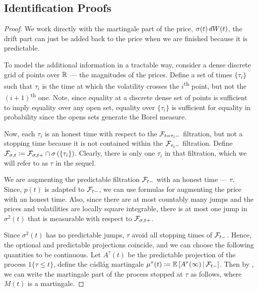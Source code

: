 \documentclass[11pt, letterpaper, twoside, final]{article}
\begin{document}
\begin{appendices}


\section{Identification Proofs}

\priceDGPGivenVol*

\begin{proof}

    We work directly with the martingale part of the price, $\sigma(t) \mathop{}\!d W(t)$, the drift part can just be
    added back to the price when we are finished because it is predictable.
    
    To model the additional information in a tractable way, consider a dense discrete grid of points over $\mathbb{R}$ ---
    the magnitudes of the prices.
    Define a set of times $\lbrace \tau_i\rbrace $ such that $\tau_i$ is the time at which the volatility crosses
    the $i$\textsuperscript{th} point, but not the $(i+1)$\textsuperscript{th} one. 
    Note, since equality at a discrete dense set of points is sufficient to imply equality over any open set,
    equality over $\lbrace \tau_i \rbrace$ is sufficient for equality in probability since the opens sets generate
    the Borel measure.
    
    Now, each $\tau_i$ is an honest time with respect to the $\mathcal{F}_{t=\tau_i-}$ filtration, but not a stopping time
    because it is not contained within the $\mathcal{F}_{\tau_i-}$ filtration.
    Define $\mathcal{F}_{\sigma,t} \coloneqq \mathcal{F}_{\sigma, t+} \cap \sigma\left(\lbrace \tau_i \rbrace\right)$. 
    Clearly, there is only one $\tau_i$ in that filtration, which we will refer to as $\tau$ in the sequel.
    
    We are augmenting the predictable filtration $\mathcal{F}_{t-}$ with an honest time --- $\tau$.
    Since, $p(t)$ is adapted to $\mathcal{F}_{t-}$, we can use formulas for augmenting the price with an honest time. 
    Also, since there are at most countably many jumps and the prices and volatilities are locally square
    integrable, there is at most one jump in $\sigma^2(t)$ that is measurable with respect to $\mathcal{F}_{\sigma, t+}$.
    
    Since $\sigma^2(t)$ has no predictable jumps, $\tau$ avoid all stopping times of $\mathcal{F}_{t-}$.  
    Hence, the optional and predictable projections coincide, and we can choose the following quantities to be
    continuous.
    Let $A^{\tau}(t)$ be the predictable projection of the process $1\lbrace \tau \leq t \rbrace$, define the
    c\'{a}dl\'{a}g martingale $\mu^{\tau}(t) \coloneqq \operatorname{\mathbb{E}}\left[A^{\tau}(\infty) \,\middle\vert\, \mathcal{F}_{t-}
    \right]$.
    Then by \textcite[eqn 2.3]{nikeghbali2007nonstopping}, we can write the martingale part of the process stopped
    at $\tau$  as follows, where $M(t)$ is a martingale.


\end{proof}
\end{appendices}
\end{document}

